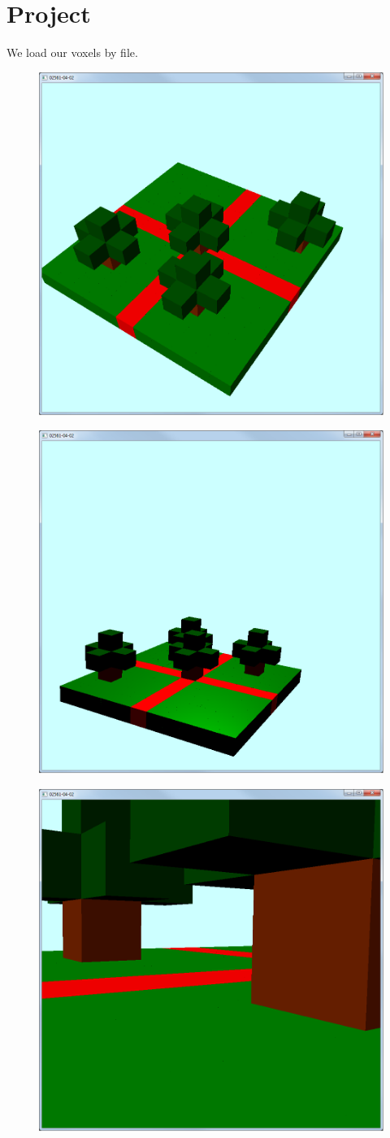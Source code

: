 \documentclass[11pt]{article}
\begin{document}
\section{Project}
We load our voxels by file.

\begin{figure}[H]
	\centering
	\includegraphics[width=0.5\linewidth]{images/project_1}
	\label{fig:project_1}
\end{figure}
\begin{figure}[H]
	\centering
	\includegraphics[width=0.5\linewidth]{images/project_2}
	\label{fig:project_2}
\end{figure}
\begin{figure}[H]
	\centering
	\includegraphics[width=0.5\linewidth]{images/project_3}
	\label{fig:project_3}
\end{figure}
\end{document}
